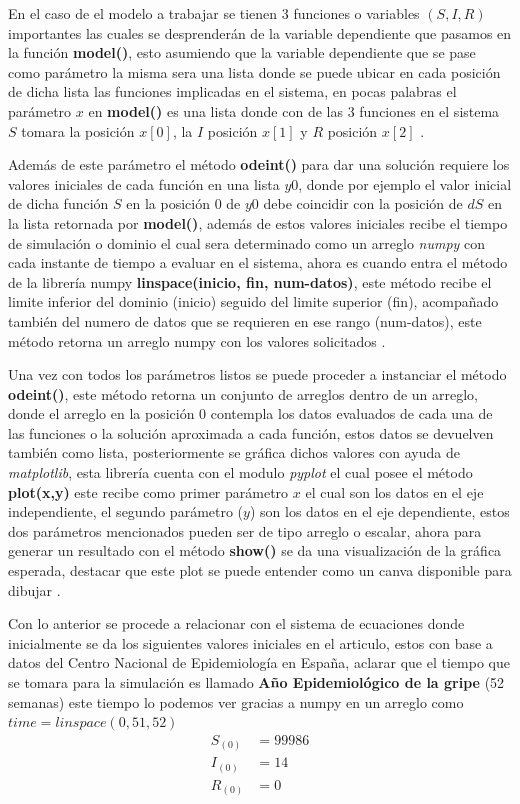 En el caso de el modelo a trabajar se tienen 3 funciones o variables $(S,I,R)$ importantes las cuales se desprenderán de la variable dependiente que pasamos en la función \textbf{model()}, esto asumiendo que la variable dependiente que se pase como parámetro la misma sera una lista donde se puede ubicar en cada posición de dicha lista las funciones implicadas en el sistema, en pocas palabras el parámetro $x$ en \textbf{model()} es una lista donde con de las 3 funciones en el sistema $S$ tomara la posición $x[0]$, la $I$ posición $x[1]$ y $R$ posición $x[2]$ \cite{modelado-python-EDO}.

Además de este parámetro el método \textbf{odeint()} para dar una solución requiere los valores iniciales de cada función en una lista $y0$, donde por ejemplo el valor inicial de dicha función $S$ en la posición 0 de $y0$ debe coincidir con la posición de $dS$ en la lista retornada por \textbf{model()}, además de estos valores iniciales recibe el tiempo de simulación o dominio el cual sera determinado como un arreglo \textit{numpy} con cada instante de tiempo a evaluar en el sistema, ahora es cuando entra el método de la librería numpy \textbf{linspace(inicio, fin, num-datos)}, este método recibe el limite inferior del dominio (inicio) seguido del limite superior (fin), acompañado también del numero de datos que se requieren en ese rango (num-datos), este método retorna un arreglo numpy con los valores solicitados \cite{numpy-linspace}.

Una vez con todos los parámetros listos se puede proceder a instanciar el método \textbf{odeint()}, este método retorna un conjunto de arreglos dentro de un arreglo, donde el arreglo en la posición 0 contempla los datos evaluados de cada una de las funciones o la solución aproximada a cada función, estos datos se devuelven también como lista, posteriormente se gráfica dichos valores con ayuda de \textit{matplotlib}, esta librería cuenta con el modulo \textit{pyplot} el cual posee el  método \textbf{plot(x,y)} este recibe como primer parámetro $x$ el cual son los datos en el eje independiente, el segundo parámetro ($y$) son los datos en el eje dependiente, estos dos parámetros mencionados pueden ser de tipo arreglo o escalar, ahora para generar un resultado con el método \textbf{show()} se da una visualización de la gráfica esperada, destacar que este plot se puede entender como un canva disponible para dibujar \cite{matplotlib-examples}.

Con lo anterior se procede a relacionar con el sistema de ecuaciones donde inicialmente se da los siguientes valores iniciales en el articulo, estos con base a datos del Centro Nacional de Epidemiología en España, aclarar que el tiempo que se tomara para la simulación es llamado \textbf{Año Epidemiológico de la gripe} (52 semanas) \cite{articulo-sir} este tiempo lo podemos ver gracias a numpy en un arreglo como $time = linspace(0,51,52)$
\begin{align*}
S_{(0)}&= 99986 \\
I_{(0)}&= 14 \\
R_{(0)}&= 0
\end{align*}

